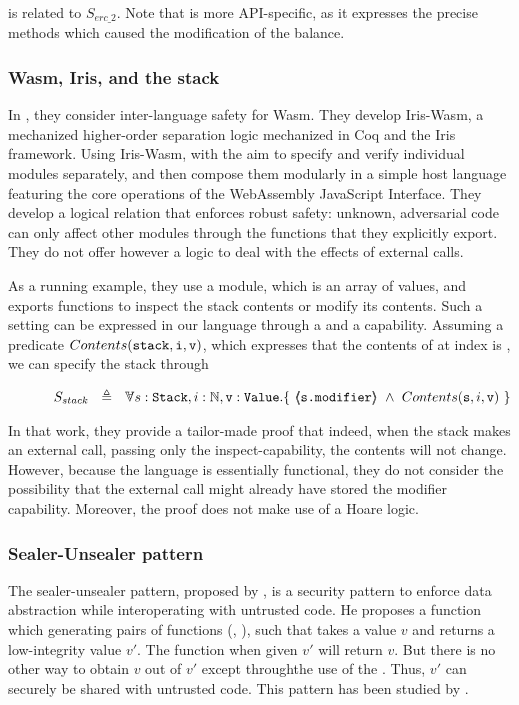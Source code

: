  is related to $S_{erc\_2}$. Note that  is more API-specific, as it expresses the precise methods which caused the modification of the balance.

\subsubsection{Wasm, Iris, and the stack}

%
In \cite{irisWasm23}, they consider inter-language safety for Wasm. They develop Iris-Wasm, a mechanized higher-order separation logic mechanized in Coq and the Iris framework. Using Iris-Wasm, with the aim to
specify and verify individual modules separately, and then compose them modularly in a simple host language
featuring the core operations of the WebAssembly JavaScript Interface. They develop a 
logical relation that enforces robust safety: unknown, adversarial code can only aﬀect other modules through
the functions that they explicitly export. 
They do not offer however a logic to deal with the effects of external calls.

As a running example, they use a  module, which is an array of values, and exports functions to inspect the stack contents or modify its contents. 
Such a setting can be expressed in our language through a  and a  capability.
Assuming a predicate $Contents(\mbox{\normalfont{\texttt{stack}}},\mbox{\normalfont{\texttt{i}}},\mbox{\normalfont{\texttt{v}}})$, which expresses that the contents of  at index  is , we can specify the stack through
 
 $$\strut \SPSP  S_{stack}\ \  \triangleq \ \ \TwoStatesN{ s:\prg{Stack},i:\mathbb{N},\prg{v}:\prg{Value}} 
 {\ \inside{\prg{s.modifier}} \ \wedge \ Contents(\prg{s},i,\prg{v})\  }$$  
 
 
 
 In that work, they provide a tailor-made proof that indeed, when the stack makes an external call, passing only the inspect-capability, the contents will not change. 
 However, because the language is essentially functional, they do not consider the possibility that the external call might already have stored the modifier capability.
 Moreover, the proof does not make use of a Hoare logic.  
 
 \subsubsection{Sealer-Unsealer pattern} 
 The sealer-unsealer pattern, proposed by \citet{JamesMorris}, is a security  pattern  to enforce data
abstraction while interoperating with untrusted  code. He proposes a function
 which generating pairs of functions (,  ), such that  takes a value $v$ and returns a low-integrity value $v'$.
The function  when given $v'$ will return $v$. But there is no other way to obtain $v$ out of $v'$ except throughthe use of the .
Thus, $v'$ can securely be shared with untrusted code.
This pattern has been studied by \citet{ddd}.

